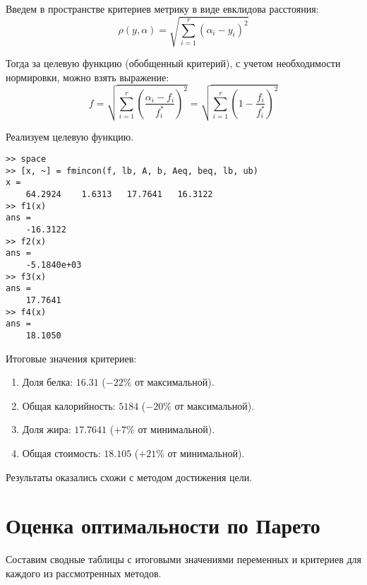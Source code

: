 Введем в пространстве критериев метрику в виде евклидова расстояния:
$$
\rho(y, \alpha) = \sqrt{\sum_{i=1}^r(\alpha_i - y_i)^2}
$$

Тогда за целевую функцию (обобщенный критерий), с учетом необходимости нормировки, можно взять выражение:
$$
f = \sqrt{ \sum_{i=1}^r \left( \frac{\alpha_i-f_i}{f_i^*} \right)^2 } 
= \sqrt{ \sum_{i=1}^r \left( 1 - \frac{f_i}{f_i^*} \right)^2 }
$$

Реализуем целевую функцию.



\begin{lstlisting}[caption=\code{Console}]
>> space
>> [x, ~] = fmincon(f, lb, A, b, Aeq, beq, lb, ub)
x =
	64.2924    1.6313   17.7641   16.3122
>> f1(x)
ans =
	-16.3122
>> f2(x)
ans =
	-5.1840e+03
>> f3(x)
ans =
	17.7641
>> f4(x)
ans =
	18.1050
\end{lstlisting}

Итоговые значения критериев:

\begin{enumerate}
	\item Доля белка: $16.31$ ($-22\%$ от максимальной).
	\item Общая калорийность: $5184$ ($-20\%$ от максимальной).
	\item Доля жира: $17.7641$ ($+7\%$ от минимальной).
	\item Общая стоимость: $18.105$ ($+21\%$ от минимальной).
\end{enumerate}

Результаты оказались схожи с методом достижения цели.

\newpage

\section{Оценка оптимальности по Парето}

Составим сводные таблицы с итоговыми значениями переменных и критериев для каждого из рассмотренных методов.

